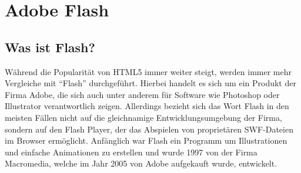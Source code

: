 \chapter{Adobe Flash}

\section{Was ist Flash?}
Während die Popularität von HTML5 immer weiter steigt, werden immer mehr
Vergleiche mit "`Flash"' durchgeführt. Hierbei handelt es sich um ein Produkt
der Firma Adobe, die sich auch unter anderem für Software wie Photoshop oder
Illustrator verantwortlich zeigen. Allerdings bezieht sich das Wort Flash in
den meisten Fällen nicht auf die gleichnamige Entwicklungsumgebung der Firma,
sondern auf den Flash Player, der das Abspielen von proprietären SWF-Dateien
im Browser ermöglicht. Anfänglich war Flash ein Programm um Illustrationen und
einfache Animationen zu erstellen und wurde 1997 von der Firma Macromedia,
welche im Jahr 2005 von Adobe aufgekauft wurde, entwickelt.

